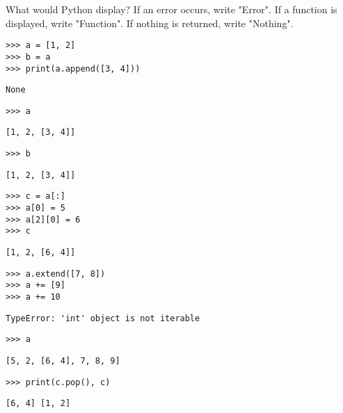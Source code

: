 \begin{blocksection}
\question What would Python display? If an error occurs, write "Error". If a function is displayed, write "Function". If nothing is returned, write "Nothing".

\begin{lstlisting}
>>> a = [1, 2]
>>> b = a
>>> print(a.append([3, 4]))
\end{lstlisting}
\begin{solution}[0.25in]
\begin{lstlisting}
None
\end{lstlisting}
\end{solution}

\begin{lstlisting}
>>> a
\end{lstlisting}
\begin{solution}[0.25in]
\begin{lstlisting}
[1, 2, [3, 4]]
\end{lstlisting}
\end{solution}

\begin{lstlisting}
>>> b
\end{lstlisting}
\begin{solution}[0.25in]
\begin{lstlisting}
[1, 2, [3, 4]]
\end{lstlisting}
\end{solution}

\begin{lstlisting}
>>> c = a[:]
>>> a[0] = 5
>>> a[2][0] = 6
>>> c
\end{lstlisting}
\begin{solution}[0.25in]
\begin{lstlisting}
[1, 2, [6, 4]]
\end{lstlisting}
\end{solution}

\begin{lstlisting}
>>> a.extend([7, 8])
>>> a += [9]
>>> a += 10
\end{lstlisting}
\begin{solution}[0.25in]
\begin{lstlisting}
TypeError: 'int' object is not iterable
\end{lstlisting}
\end{solution}

\begin{lstlisting}
>>> a
\end{lstlisting}
\begin{solution}[0.25in]
\begin{lstlisting}
[5, 2, [6, 4], 7, 8, 9]
\end{lstlisting}
\end{solution}
\end{blocksection}
\begin{blocksection}
\begin{lstlisting}
>>> print(c.pop(), c)
\end{lstlisting}
\begin{solution}[0.25in]
\begin{lstlisting}
[6, 4] [1, 2]
\end{lstlisting}
\end{solution}
\end{blocksection}